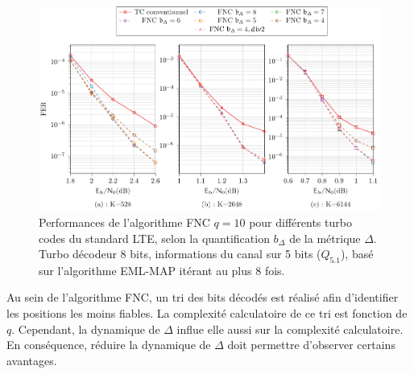 

\begin{figure}[!t]
	\hspace*{-.075\textwidth}
	\includegraphics[width=1.1\textwidth]{main/ch4_fig/final/tikz_last/fnc10_format_8b.pdf}
	\caption{Performances de l'algorithme FNC $q=10$ pour différents turbo codes du standard LTE, selon la quantification $b_{\Delta}$ 
	de la métrique $\Delta$.
	Turbo décodeur 8 bits, informations du canal sur 5 bits ($Q_{5.1}$), basé sur l'algorithme EML-MAP itérant au plus 8 fois.
	\label{fig:fnc_format_8b}}
\end{figure}

Au sein de l'algorithme FNC, un tri des bits décodés est réalisé afin d'identifier les positions les moins fiables. La
complexité calculatoire de ce tri est fonction de $q$. Cependant, la dynamique de $\Delta$ influe elle aussi sur la
complexité calculatoire. En conséquence, réduire la dynamique de $\Delta$ doit permettre d'observer certains avantages.

